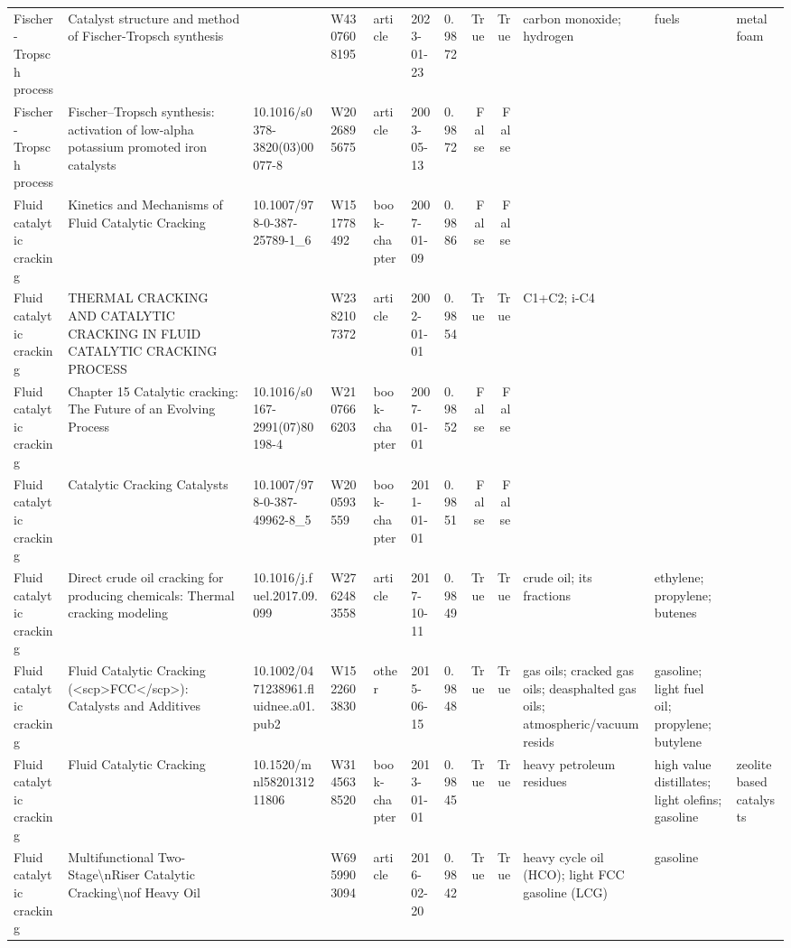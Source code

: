 \begin{tabular}{lllllllrrlll}
Fischer-Tropsch process & Catalyst structure and method of Fischer-Tropsch synthesis &  & W4307608195 & article & 2023-01-23 & 0.9872 & True & True & carbon monoxide; hydrogen & fuels & metal foam \\
Fischer-Tropsch process & Fischer–Tropsch synthesis: activation of low-alpha potassium promoted iron catalysts & 10.1016/s0378-3820(03)00077-8 & W2026895675 & article & 2003-05-13 & 0.9872 & False & False &  &  &  \\
Fluid catalytic cracking & Kinetics and Mechanisms of Fluid Catalytic Cracking & 10.1007/978-0-387-25789-1\_6 & W151778492 & book-chapter & 2007-01-09 & 0.9886 & False & False &  &  &  \\
Fluid catalytic cracking & THERMAL CRACKING AND CATALYTIC CRACKING IN FLUID CATALYTIC CRACKING PROCESS &  & W2382107372 & article & 2002-01-01 & 0.9854 & True & True & C1+C2; i-C4 &  &  \\
Fluid catalytic cracking & Chapter 15 Catalytic cracking: The Future of an Evolving Process & 10.1016/s0167-2991(07)80198-4 & W2107666203 & book-chapter & 2007-01-01 & 0.9852 & False & False &  &  &  \\
Fluid catalytic cracking & Catalytic Cracking Catalysts & 10.1007/978-0-387-49962-8\_5 & W200593559 & book-chapter & 2011-01-01 & 0.9851 & False & False &  &  &  \\
Fluid catalytic cracking & Direct crude oil cracking for producing chemicals: Thermal cracking modeling & 10.1016/j.fuel.2017.09.099 & W2762483558 & article & 2017-10-11 & 0.9849 & True & True & crude oil; its fractions & ethylene; propylene; butenes &  \\
Fluid catalytic cracking & Fluid Catalytic Cracking (<scp>FCC</scp>): Catalysts and Additives & 10.1002/0471238961.fluidnee.a01.pub2 & W1522603830 & other & 2015-06-15 & 0.9848 & True & True & gas oils; cracked gas oils; deasphalted gas oils; atmospheric/vacuum resids & gasoline; light fuel oil; propylene; butylene &  \\
Fluid catalytic cracking & Fluid Catalytic Cracking & 10.1520/mnl5820131211806 & W3145638520 & book-chapter & 2013-01-01 & 0.9845 & True & True & heavy petroleum residues & high value distillates; light olefins; gasoline & zeolite based catalysts \\
Fluid catalytic cracking & Multifunctional Two-Stage\textbackslash nRiser Catalytic Cracking\textbackslash nof Heavy Oil &  & W6959903094 & article & 2016-02-20 & 0.9842 & True & True & heavy cycle oil (HCO); light FCC gasoline (LCG) & gasoline &  \\

\end{tabular}
